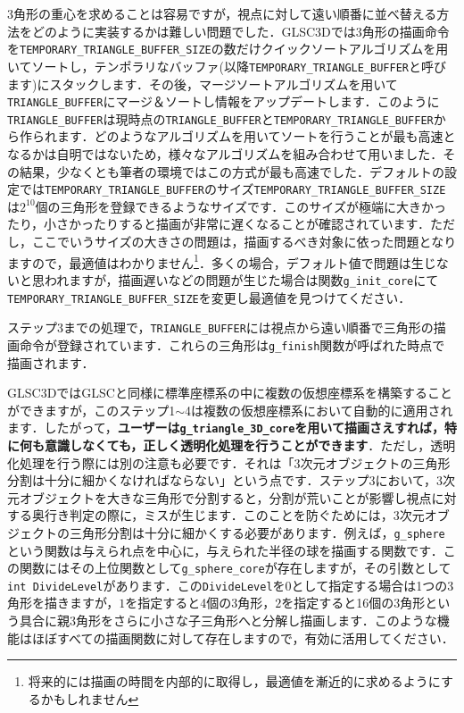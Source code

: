 \documentclass[a4paper,12pt]{jsarticle}%
\begin{document}

3角形の重心を求めることは容易ですが，視点に対して遠い順番に並べ替える方法をどのように実装するかは難しい問題でした．GLSC3Dでは3角形の描画命令を\verb|TEMPORARY_TRIANGLE_BUFFER_SIZE|の数だけクイックソートアルゴリズムを用いてソートし，テンポラリなバッファ(以降\verb|TEMPORARY_TRIANGLE_BUFFER|と呼びます)にスタックします．その後，マージソートアルゴリズムを用いて\verb|TRIANGLE_BUFFER|にマージ＆ソートし情報をアップデートします．このように\verb|TRIANGLE_BUFFER|は現時点の\verb|TRIANGLE_BUFFER|と\verb|TEMPORARY_TRIANGLE_BUFFER|から作られます．どのようなアルゴリズムを用いてソートを行うことが最も高速となるかは自明ではないため，様々なアルゴリズムを組み合わせて用いました．その結果，少なくとも筆者の環境ではこの方式が最も高速でした．デフォルトの設定では\verb|TEMPORARY_TRIANGLE_BUFFER|のサイズ\verb|TEMPORARY_TRIANGLE_BUFFER_SIZE|は$2^{10}$個の三角形を登録できるようなサイズです．このサイズが極端に大きかったり，小さかったりすると描画が非常に遅くなることが確認されています．ただし，ここでいうサイズの大きさの問題は，描画するべき対象に依った問題となりますので，最適値はわかりません\footnote{将来的には描画の時間を内部的に取得し，最適値を漸近的に求めるようにするかもしれません}．多くの場合，デフォルト値で問題は生じないと思われますが，描画遅いなどの問題が生じた場合は関数\verb|g_init_core|にて\verb|TEMPORARY_TRIANGLE_BUFFER_SIZE|を変更し最適値を見つけてください．


ステップ3までの処理で，\verb|TRIANGLE_BUFFER|には視点から遠い順番で三角形の描画命令が登録されています．これらの三角形は\verb|g_finish|関数が呼ばれた時点で描画されます．

\vspace{10mm}
GLSC3DではGLSCと同様に標準座標系の中に複数の仮想座標系を構築することができますが，このステップ1$\sim$4は複数の仮想座標系において自動的に適用されます．したがって，{\bf ユーザーは\verb|g_triangle_3D_core|を用いて描画さえすれば，特に何も意識しなくても，正しく透明化処理を行うことができます}．ただし，透明化処理を行う際には別の注意も必要です．それは「3次元オブジェクトの三角形分割は十分に細かくなければならない」という点です．ステップ3において，3次元オブジェクトを大きな三角形で分割すると，分割が荒いことが影響し視点に対する奥行き判定の際に，ミスが生じます．このことを防ぐためには，3次元オブジェクトの三角形分割は十分に細かくする必要があります．例えば，\verb|g_sphere|という関数は与えられ点を中心に，与えられた半径の球を描画する関数です．この関数にはその上位関数として\verb|g_sphere_core|が存在しますが，その引数として\verb|int DivideLevel|があります．この\verb|DivideLevel|を$0$として指定する場合は1つの3角形を描きますが，$1$を指定すると4個の3角形，$2$を指定すると16個の3角形という具合に親3角形をさらに小さな子三角形へと分解し描画します．このような機能はほぼすべての描画関数に対して存在しますので，有効に活用してください．
\end{document}
